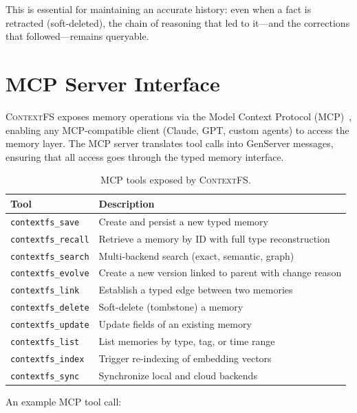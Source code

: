 \documentclass[12pt,a4paper]{article}
\theoremstyle{definition}
\newcommand{\ContextFS}{\textsc{ContextFS}}
\begin{document}
This is essential for maintaining an accurate history: even when a fact is retracted (soft-deleted), the chain of reasoning that led to it---and the corrections that followed---remains queryable.

\section{MCP Server Interface}\label{sec:mcp}

\ContextFS{} exposes memory operations via the Model Context Protocol (MCP)~\citep{anthropic2024mcp}, enabling any MCP-compatible client (Claude, GPT, custom agents) to access the memory layer.
The MCP server translates tool calls into GenServer messages, ensuring that all access goes through the typed memory interface.

\begin{table}[H]
\centering
\caption{MCP tools exposed by \ContextFS{}.}
\label{tab:mcp-tools}
\begin{tabularx}{\textwidth}{lX}
\toprule
\textbf{Tool} & \textbf{Description} \\
\midrule
\texttt{contextfs\_save} & Create and persist a new typed memory \\
\texttt{contextfs\_recall} & Retrieve a memory by ID with full type reconstruction \\
\texttt{contextfs\_search} & Multi-backend search (exact, semantic, graph) \\
\texttt{contextfs\_evolve} & Create a new version linked to parent with change reason \\
\texttt{contextfs\_link} & Establish a typed edge between two memories \\
\texttt{contextfs\_delete} & Soft-delete (tombstone) a memory \\
\texttt{contextfs\_update} & Update fields of an existing memory \\
\texttt{contextfs\_list} & List memories by type, tag, or time range \\
\texttt{contextfs\_index} & Trigger re-indexing of embedding vectors \\
\texttt{contextfs\_sync} & Synchronize local and cloud backends \\
\bottomrule
\end{tabularx}
\end{table}

An example MCP tool call:
\end{document}
